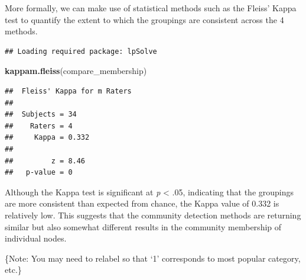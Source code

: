 \documentclass[
]{book}
\newenvironment{Shaded}{\begin{snugshade}}{\end{snugshade}}
\newcommand{\AttributeTok}[1]{\textcolor[rgb]{0.13,0.29,0.53}{#1}}
\newcommand{\CommentTok}[1]{\textcolor[rgb]{0.56,0.35,0.01}{\textit{#1}}}
\newcommand{\FunctionTok}[1]{\textcolor[rgb]{0.13,0.29,0.53}{\textbf{#1}}}
\newcommand{\NormalTok}[1]{#1}
\newcommand{\OtherTok}[1]{\textcolor[rgb]{0.56,0.35,0.01}{#1}}
\newcommand{\SpecialCharTok}[1]{\textcolor[rgb]{0.81,0.36,0.00}{\textbf{#1}}}
\begin{document}
More formally, we can make use of statistical methods such as the Fleiss' Kappa test to quantify the extent to which the groupings are consistent across the 4 methods.

\begin{Shaded}
\end{Shaded}

\begin{verbatim}
## Loading required package: lpSolve
\end{verbatim}

\begin{Shaded}
\begin{Highlighting}[]
\FunctionTok{kappam.fleiss}\NormalTok{(compare\_membership)}
\end{Highlighting}
\end{Shaded}

\begin{verbatim}
##  Fleiss' Kappa for m Raters
## 
##  Subjects = 34 
##    Raters = 4 
##     Kappa = 0.332 
## 
##         z = 8.46 
##   p-value = 0
\end{verbatim}

Although the Kappa test is significant at \emph{p} \textless{} .05, indicating that the groupings are more consistent than expected from chance, the Kappa value of 0.332 is relatively low. This suggests that the community detection methods are returning similar but also somewhat different results in the community membership of individual nodes.

\{Note: You may need to relabel so that `1' corresponds to most popular category, etc.\}
\end{document}
